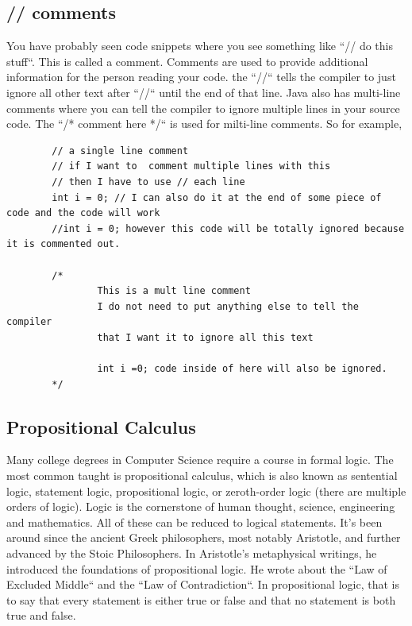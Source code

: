 \documentclass[11]{article}
\begin{document}
\subsection{// comments}
You have probably seen code snippets where you see something like ``// do this stuff``. This is called a comment. Comments are used to provide additional information for the person reading your code. the ``//`` tells the compiler to just ignore all other text after ``//`` until the end of that line. Java also has multi-line comments where you can tell the compiler to ignore multiple lines in your source code. The ``/* comment here */`` is used for milti-line comments. So for example, 

\begin{lstlisting}
        // a single line comment
        // if I want to  comment multiple lines with this
        // then I have to use // each line
        int i = 0; // I can also do it at the end of some piece of code and the code will work
        //int i = 0; however this code will be totally ignored because it is commented out.
        
        /*
				This is a mult line comment
				I do not need to put anything else to tell the compiler
				that I want it to ignore all this text
				
				int i =0; code inside of here will also be ignored.        
        */
\end{lstlisting}

\subsection{Propositional Calculus}
Many college degrees in Computer Science require a course in formal logic. The most common taught is propositional calculus, which is also known as sentential logic, statement logic, propositional logic,  or zeroth-order logic (there are multiple orders of logic). Logic is the cornerstone of human thought, science, engineering and mathematics. All of these can be reduced to logical statements. It's been around since the ancient Greek philosophers, most notably Aristotle, and further advanced by the Stoic Philosophers. In Aristotle's metaphysical writings, he introduced the foundations of propositional logic. He wrote about the ``Law of Excluded Middle`` and the ``Law of Contradiction``. In propositional logic, that is to say that every statement is either true or false and that no statement is both true and false.\\
\end{document}
